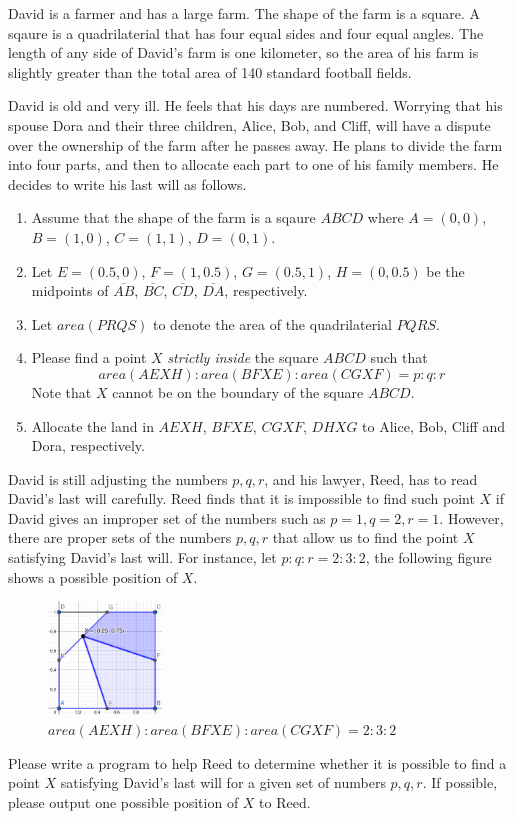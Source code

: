David is a farmer and has a large farm. The shape of the farm is a square.
A sqaure is a quadrilaterial that has four equal sides and four equal angles.
The length of any side of David's farm is one kilometer, so the area of his farm
is slightly greater than the total area of 140 standard football fields.

David is old and very ill. He feels that his days are numbered.
Worrying that his spouse Dora and their three children, Alice, Bob, and Cliff, 
will have a dispute over the ownership
of the farm after he passes away.
He plans to divide the farm into four parts, 
and then to allocate each part to one of his family members.
He decides to write his last will as follows.
\begin{enumerate}
\tightlist
\item Assume that the shape of the farm is a sqaure $ABCD$ where $A=(0,0)$, $B=(1,0)$, 
$C=(1,1)$, $D=(0,1)$. 
\item Let $E=(0.5,0)$, $F=(1,0.5)$, $G=(0.5,1)$, $H=(0,0.5)$ be the midpoints of 
$\overline{AB}$, $\overline{BC}$, $\overline{CD}$, $\overline{DA}$, respectively.
\item Let $area(PRQS)$ to denote the area of the quadrilaterial $PQRS$.
\item Please find a point $X$ \emph{strictly inside} the square $ABCD$ such 
that  $$area(AEXH):area(BFXE):area(CGXF) = p:q:r$$
Note that $X$ cannot be on the boundary of the square $ABCD$.
\item Allocate the land in $AEXH$, $BFXE$, $CGXF$, $DHXG$ to Alice, Bob, Cliff and Dora,
respectively.
\end{enumerate}

David is still adjusting the numbers $p,q,r$, and his lawyer, Reed, has to read David's
last will carefully. Reed finds that it is impossible to find such point $X$ if 
David gives an improper set of the numbers such as $p=1, q=2, r=1$. 
However, there are proper sets of the numbers $p,q,r$ that allow us to find the point $X$
satisfying David's last will.
For instance, let $p:q:r = 2:3:2$, the following figure shows a possible position of $X$.

\begin{figure}[h]
\center
\includegraphics[width=0.27\textwidth]{image/farm.png}
\caption{$area(AEXH):area(BFXE):area(CGXF) = 2:3:2$}
\end{figure}

Please write a program to help Reed to determine whether it is possible to find
a point $X$ satisfying David's last will for a given set of numbers $p,q,r$.
If possible, please output one possible position of $X$ to Reed.
